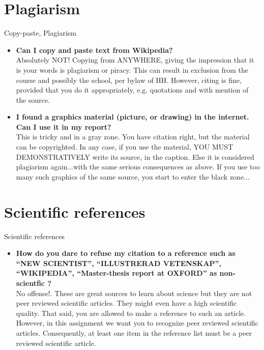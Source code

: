 \documentclass[pdf]{beamer}
\begin{document}
\section{Plagiarism} 
\begin{frame}{Copy-paste,  Plagiarism}
\begin{itemize} 
\item {\bf Can I copy and paste text from Wikipedia?}\\
Absolutely NOT! Copying from ANYWHERE,  giving the impression that 
it is your words is plagiarism or piracy. This  can result in
exclusion from  the course and possibly  the school,  per bylaw of HH.
However,   citing is fine,  
provided that you  do it appropriately, e.g. quotations and with mention of the source.
\item {\bf I found a graphics material (picture, or drawing) in the
  internet.  Can I use it in my report? }
 \\
This is tricky and in        a gray zone. You have citation right, but
the material can be copyrighted.  In any case, if you use the material,  YOU MUST
DEMONSTRATIVELY write its source, in the caption. Else it is considered plagiarism again...with 
the same serious consequences as above. If you use too many such
graphics of the same source, you start to enter the black zone...
\end{itemize} 
\end {frame}

\section{Scientific references} 
\begin{frame}{Scientific references}
\begin{itemize}
\item {\bf How do you dare to refuse my citation to a reference  such as
  ``NEW SCIENTIST'', ``ILLUSTRERAD VETENSKAP'', ``WIKIPEDIA'',  ``Master-thesis report at OXFORD'' as non-scientfic ?} \\
No offense!. These are great sources to learn about science but they
are not peer reviewed scientific articles. They might even have a high
scientific quality. That said, you are allowed to make a reference to such an article. However, in this assignment we want you to recognize peer
reviewed scientific articles. Consequently, at least one item in the
reference list must be a peer reviewed scientific article. 
\end{itemize}
 \end{frame} 
\end{document}
